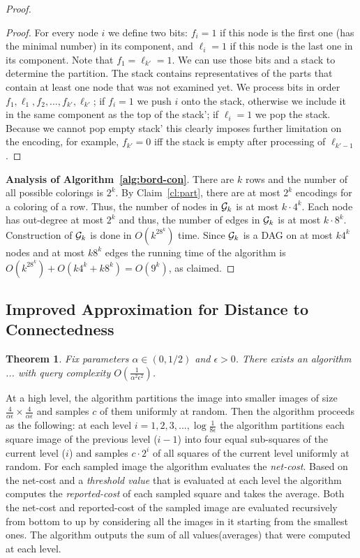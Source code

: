 \documentclass[11pt,english]{article}
\newtheorem{theorem}{Theorem}[section]
\numberwithin{figure}{section}
\newcommand{\mydelta}{\epsilon} \newcommand{\bigdelta}{{\epsilon_0}} \newcommand{\dsquares}{d_{\rm squares}}
\begin{document}
\begin{proof}
\begin{proof}
For every node $i$ we define two bits: $f_i=1$ if this node is the first one
(has the minimal number) in its component, and $\ell_i=1$ if this node is the
last one in its component.  Note that $f_1=\ell_{k'}=1$.  We can use those bits
and a stack to determine the partition.  The stack contains representatives of
the parts that contain at least one node that was not examined yet.  We process
bits in order $f_1,\ell_1,f_2,\ldots,f_{k'},\ell_{k'}$; if $f_i=1$ we push $i$ onto
the stack, otherwise we include it in the same component as the top of the
stac{k'}; if $\ell_i=1$ we pop the stack.  Because we cannot pop empty stac{k'} this
clearly imposes further limitation on the encoding, for example, $f_{k'}=0$ iff
the stack is empty after processing of $\ell_{{k'}-1}$.
\end{proof}



{\bf Analysis of Algorithm~\ref{alg:bord-con}}. There are $k$ rows and the number of all possible colorings is $2^k$. By Claim~\ref{cl:part}, there are at most $2^k$ encodings for a coloring of a row. Thus, the number of nodes in ${\mathcal G}_k$ is at most $k\cdot4^k$. Each node has out-degree at most $2^k$ and thus, the number of edges in ${\mathcal G}_k$ is at most $k\cdot8^k$. Construction of ${\mathcal G}_k$ is done in $O(k^28^k)$ time. Since ${\mathcal G}_k$ is a DAG on at most $k4^k$ nodes and at most $k8^k$ edges the running time of the algorithm is $O(k^28^k)+O(k4^k+k8^k)=O(9^k)$, as claimed.
\end{proof}



\fi




\iffalse
\subsection{Improved Approximation for Distance to Connectedness}\label{sec:improved-approximation-for-connectedness}
\begin{theorem}
Fix parameters $\alpha\in(0,1/2)$ and $\mydelta>0$. There exists an algorithm ...
with query complexity $O(\frac{1}{\alpha^{2}\mydelta^{2}})$.
\end{theorem}
At a high level, the algorithm partitions the image into smaller images of size $\frac{4}{\alpha\mydelta}\times\frac{4}{\alpha\mydelta}$ and samples $c$ of them uniformly at random. Then the algorithm proceeds as the following: at each level $i=1,2,3,...,\log\frac{1}{8\mydelta}$ the algorithm partitions each square image of the previous level ($i-1$) into four equal sub-squares of the current level ($i$) and samples $c\cdot2^{i}$ of all squares of the current level uniformly at random. For each sampled image the algorithm evaluates the \emph{net-cost}. Based on the net-cost and a \emph{threshold value} that is evaluated at each level the algorithm computes the \emph{reported-cost} of each sampled square and takes the average. Both the net-cost and reported-cost of the sampled image are evaluated recursively from bottom to up by considering all the images in it starting from the smallest ones. The algorithm outputs the sum of all values(averages) that were computed at each level.
\end{document}
